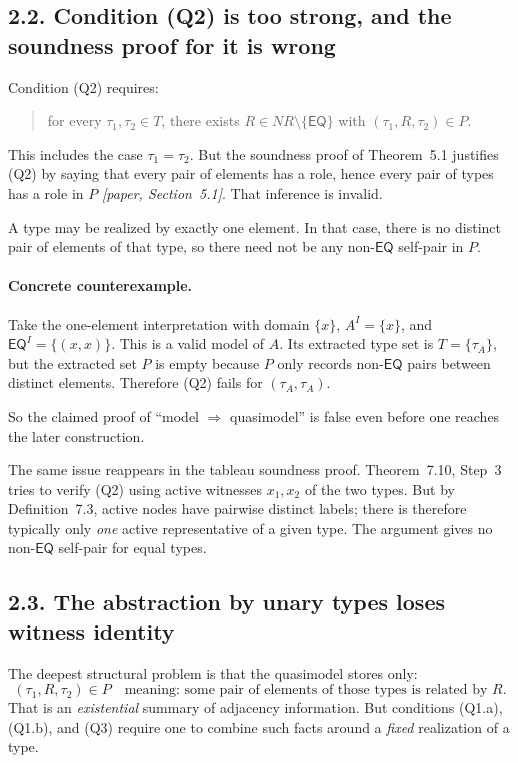 \documentclass[11pt]{article}
\newcommand{\Paper}[1]{\textit{[paper, #1]}}
\newcommand{\role}[1]{\ensuremath{\mathsf{#1}}}
\newcommand{\EQ}{\role{EQ}}
\begin{document}
\subsection*{2.2. Condition (Q2) is too strong, and the soundness proof for it is wrong}

Condition (Q2) requires:
\begin{quote}
for every $\tau_1,\tau_2 \in T$, there exists $R \in NR \setminus \{\EQ\}$ with $(\tau_1,R,\tau_2) \in P$.
\end{quote}
This includes the case $\tau_1 = \tau_2$. But the soundness proof of Theorem~5.1 justifies (Q2) by saying that every pair of elements has a role, hence every pair of types has a role in $P$ \Paper{Section~5.1}. That inference is invalid.

A type may be realized by exactly one element. In that case, there is no distinct pair of elements of that type, so there need not be any non-$\EQ$ self-pair in $P$.

\paragraph{Concrete counterexample.}
Take the one-element interpretation with domain $\{x\}$, $A^I = \{x\}$, and $\EQ^I = \{(x,x)\}$. This is a valid model of $A$. Its extracted type set is $T = \{\tau_A\}$, but the extracted set $P$ is empty because $P$ only records non-$\EQ$ pairs between distinct elements. Therefore (Q2) fails for $(\tau_A,\tau_A)$.

So the claimed proof of ``model $\Rightarrow$ quasimodel'' is false even before one reaches the later construction.

The same issue reappears in the tableau soundness proof. Theorem~7.10, Step~3 tries to verify (Q2) using active witnesses $x_1,x_2$ of the two types. But by Definition~7.3, active nodes have pairwise distinct labels; there is therefore typically only \emph{one} active representative of a given type. The argument gives no non-$\EQ$ self-pair for equal types.

\subsection*{2.3. The abstraction by unary types loses witness identity}

The deepest structural problem is that the quasimodel stores only:
\[
(\tau_1,R,\tau_2) \in P \quad \text{meaning: some pair of elements of those types is related by } R.
\]
That is an \emph{existential} summary of adjacency information. But conditions (Q1.a), (Q1.b), and (Q3) require one to combine such facts around a \emph{fixed} realization of a type.
\end{document}
